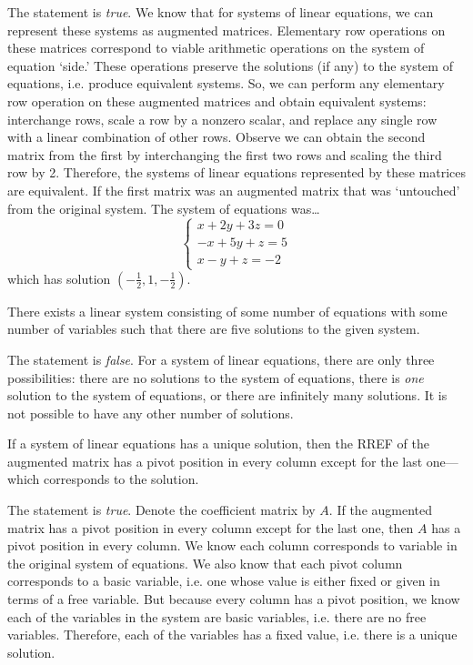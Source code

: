 \documentclass[11pt,letterpaper]{article}
\begin{document}
\sol The statement is \textit{true}. We know that for systems of linear equations, we can represent these systems as augmented matrices. Elementary row operations on these matrices correspond to viable arithmetic operations on the system of equation `side.' These operations preserve the solutions (if any) to the system of equations, i.e. produce equivalent systems. So, we can perform any elementary row operation on these augmented matrices and obtain equivalent systems: interchange rows, scale a row by a nonzero scalar, and replace any single row with a linear combination of other rows. Observe we can obtain the second matrix from the first by interchanging the first two rows and scaling the third row by 2. Therefore, the systems of linear equations represented by these matrices are equivalent. If the first matrix was an augmented matrix that was `untouched' from the original system. The system of equations was\dots
	\[
	\begin{cases}
	x + 2y + 3z= 0 \\
	-x + 5y + z= 5 \\
	x - y + z= -2 
	\end{cases}
	\]
which has solution $(-\frac{1}{2}, 1, -\frac{1}{2})$. \pvspace{1.3cm}



 There exists a linear system consisting of some number of equations with some number of variables such that there are five solutions to the given system. \pspace

\sol The statement is \textit{false}. For a system of linear equations, there are only three possibilities: there are no solutions to the system of equations, there is \textit{one} solution to the system of equations, or there are infinitely many solutions. It is not possible to have any other number of solutions. \pvspace{1.3cm}



 If a system of linear equations has a unique solution, then the RREF of the augmented matrix has a pivot position in every column except for the last one---which corresponds to the solution. \pspace 

\sol The statement is \textit{true}. Denote the coefficient matrix by $A$. If the augmented matrix has a pivot position in every column except for the last one, then $A$ has a pivot position in every column. We know each column corresponds to variable in the original system of equations. We also know that each pivot column corresponds to a basic variable, i.e. one whose value is either fixed or given in terms of a free variable. But because every column has a pivot position, we know each of the variables in the system are basic variables, i.e. there are no free variables. Therefore, each of the variables has a fixed value, i.e. there is a unique solution. \pvspace{1.3cm}
\end{document}

